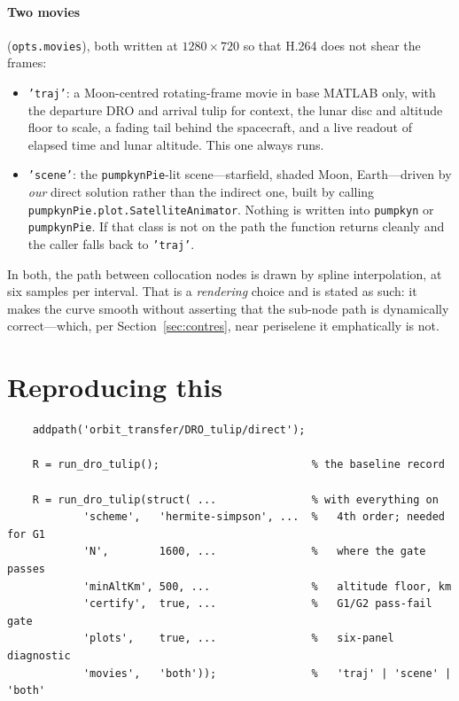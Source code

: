 \documentclass[11pt]{article}
\newcommand{\code}[1]{\texttt{#1}}
\begin{document}
\paragraph{Two movies} (\code{opts.movies}), both written at $1280\times720$
so that H.264 does not shear the frames:
\begin{itemize}
  \item \code{'traj'}: a Moon-centred rotating-frame movie in base MATLAB only,
        with the departure DRO and arrival tulip for context, the lunar disc and
        altitude floor to scale, a fading tail behind the spacecraft, and a live
        readout of elapsed time and lunar altitude. This one always runs.
  \item \code{'scene'}: the \code{pumpkynPie}-lit scene---starfield, shaded
        Moon, Earth---driven by \emph{our} direct solution rather than the
        indirect one, built by calling \code{pumpkynPie.plot.SatelliteAnimator}.
        Nothing is written into \code{pumpkyn} or \code{pumpkynPie}. If that
        class is not on the path the function returns cleanly and the caller
        falls back to \code{'traj'}.
\end{itemize}
In both, the path between collocation nodes is drawn by spline interpolation, at
six samples per interval. That is a \emph{rendering} choice and is stated as
such: it makes the curve smooth without asserting that the sub-node path is
dynamically correct---which, per Section~\ref{sec:contres}, near periselene it
emphatically is not.

\section*{Reproducing this}

\begin{verbatim}
    addpath('orbit_transfer/DRO_tulip/direct');

    R = run_dro_tulip();                        % the baseline record

    R = run_dro_tulip(struct( ...               % with everything on
            'scheme',   'hermite-simpson', ...  %   4th order; needed for G1
            'N',        1600, ...               %   where the gate passes
            'minAltKm', 500, ...                %   altitude floor, km
            'certify',  true, ...               %   G1/G2 pass-fail gate
            'plots',    true, ...               %   six-panel diagnostic
            'movies',   'both'));               %   'traj' | 'scene' | 'both'
\end{verbatim}
\end{document}
